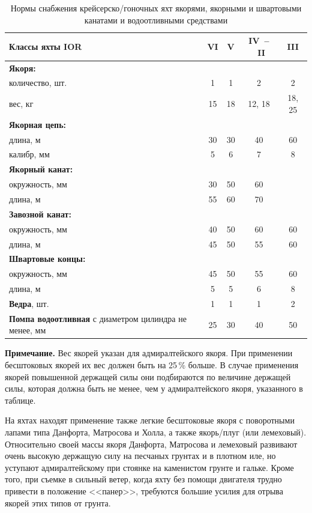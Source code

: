 \documentclass[a4paper, 12pt, twoside, final, book, russian, fittopage, cyremdash]{ncc}
\begin{document}
\begin{table}[htb]
  \centering{}
  \begin{tabular}{p{}|c|c|c|c}
    \toprule
    Классы яхты IOR & VI & V & IV~--~II & III \\
    \midrule
    \textbf{Якоря:} \\ 
    количество, шт. &  1 & 1 & 2 & 2 \\
    вес, кг & 15 & 18 & 12, 18 & 18, 25 \\ 
    \midrule
    \textbf{Якорная цепь:} \\
    длина, м & 30 & 30 & 40 & 60 \\
    калибр, мм & 5 & 6 & 7 & 8 \\
    \midrule
    \textbf{Якорный канат:} \\
    окружность, мм & 30 & 50 & 60 \\
    длина, м & 55 & 60 & 70 \\
    \midrule
    \textbf{Завозной канат:} \\
    окружность, мм & 40 & 50 & 60 & 60 \\
    длина, м & 45 & 50 & 55 & 60 \\
    \midrule
    \textbf{Швартовые концы:} \\
    окружность, мм & 45 & 50 & 55 & 60 \\
    длина, м & 5 & 5 & 6 & 8 \\
    \midrule
    \textbf{Ведра}, шт. & 1 & 1 & 1 & 2 \\
    \midrule
    \textbf{Помпа водоотливная} 
    с диаметром цилиндра не менее, мм & 25 & 30 & 40 & 50 \\
    \bottomrule
  \end{tabular}
  \caption{Нормы снабжения крейсерско\-/гоночных яхт якорями, якорными и швартовыми канатами и водоотливными средствами}
  \label{tab:2}
  \textbf{Примечание. }Вес якорей указан для адмиралтейского якоря. При применении бесштоковых якорей их вес должен быть на 25\,\% больше. В случае применения якорей повышенной держащей силы они подбираются по величине держащей силы, которая должна быть не менее, чем у адмиралтейского якоря, указанного в таблице.
\end{table}

На яхтах находят применение также легкие бесштоковые якоря с поворотными лапами типа Данфорта, Матросова и Холла, а также якорь\-/плуг (или лемеховый). Относительно своей массы якоря Данфорта, Матросова и лемеховый развивают очень высокую держащую силу на песчаных грунтах и в плотном иле, но уступают адмиралтейскому при стоянке на каменистом грунте и гальке. Кроме того, при съемке в сильный ветер, когда яхту без помощи двигателя трудно привести в положение <<панер>>, требуются большие усилия для отрыва якорей этих типов от грунта. 
\end{document}

